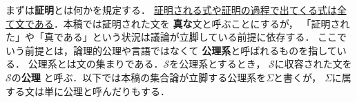 	
	まずは{\bf 証明}とは何かを規定する．
	\underline{証明される式や証明の過程で出てくる式は全て文である}．本稿では証明された文を
	{\bf 真な}文と呼ぶことにするが，
	「証明された」や「真である」という状況は議論が立脚している前提に依存する．
	ここでいう前提とは，論理的公理や言語ではなくて
	{\bf 公理系}と呼ばれるものを指している．
	公理系とは文の集まりである．$\mathscr{S}$を公理系とするとき，
	$\mathscr{S}$に収容された文を$\mathscr{S}$の{\bf 公理}
	と呼ぶ．以下では本稿の集合論が立脚する公理系を$\Sigma$と書くが，
	$\Sigma$に属する文は単に公理と呼んだりもする．
	
